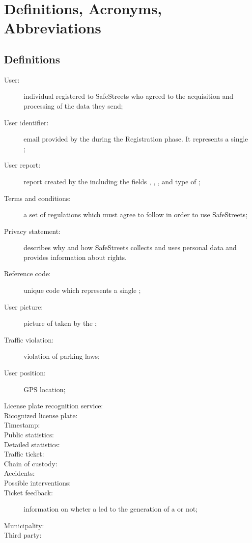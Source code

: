 \documentclass[../../rasd.tex]{subfiles}
\begin{document}
\section{Definitions, Acronyms, Abbreviations\label{sect:1.3}}

\subsection{Definitions\label{sect:1.3.1}}
\begin{description}
	\item[User:] individual registered to SafeStreets who agreed to the acquisition and processing of the data they send;
	\item[User identifier:] email provided by the  during the Registration phase. It represents a single ;
	\item[User report:] report created by the  including the fields , , ,  and type of ;
	\item[Terms and conditions:] a set of regulations which  must agree to follow	in order to use SafeStreets;
	\item[Privacy statement:] describes why and how SafeStreets collects and uses personal data and provides information about  rights.
	\item[Reference code:] unique code which represents a single ;
	\item[User picture:] picture of  taken by the ;
	\item[Traffic violation:] violation of parking laws;
	\item[User position:]  GPS location;
	\item[License plate recognition service:]
	\item[Ricognized license plate:]
	\item[Timestamp:]
	\item[Public statistics:]
	\item[Detailed statistics:]
	\item[Traffic ticket:]
	\item[Chain of custody:]
	\item[Accidents:]
	\item[Possible interventions:]
	\item[Ticket feedback:] information on wheter a  led to the generation of a  or not;
	\item[Municipality:]
	\item[Third party:]
\end{description}
\end{document}
